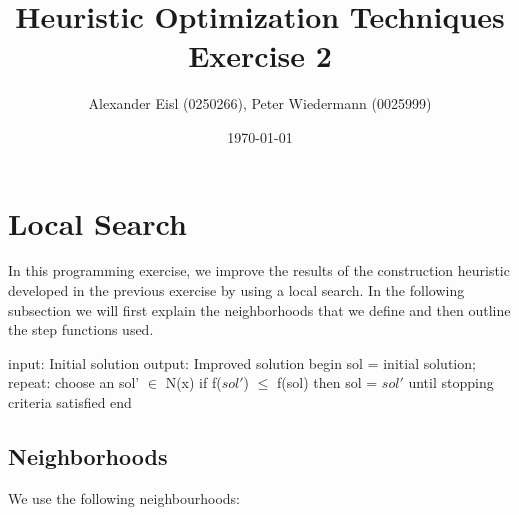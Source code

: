 \documentclass{scrartcl}
\author{Alexander Eisl (0250266), Peter Wiedermann (0025999)}
\date{\today}
\title{Heuristic Optimization Techniques \\ Exercise 2}
\begin{document}
\maketitle


\section{Local Search}
\label{sec:deterministic}
In this programming exercise, we improve the results of the construction
heuristic developed in the previous exercise by using a local search. In the following
subsection we will first explain the neighborhoods that we define and then outline the
step functions used.

\begin{algorithm}[caption={Local search}]
    input: Initial solution
    output: Improved solution
    begin
    	sol = initial solution;
	repeat:
		choose an sol' $\in$ N(x) 
		if f($sol'$) $\leq$ f(sol) then
			sol = $sol'$
	until stopping criteria satisfied
    end
\end{algorithm}

\subsection{Neighborhoods}
\label{neighborhoods}
We use the following neighbourhoods:
\end{document}
